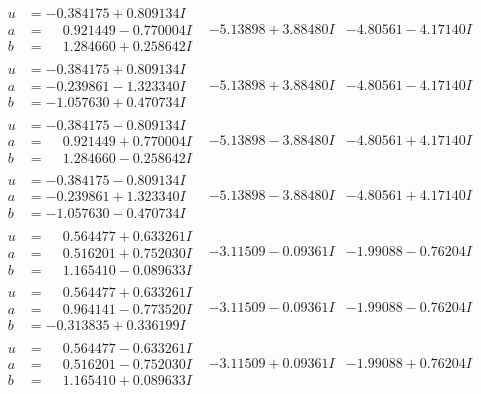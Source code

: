 \documentclass[1p]{elsarticle_modified}
\theoremstyle{definition}
\begin{document}
$$\begin{array}{c|c|c}
\begin{aligned}
u &= -0.384175 + 0.809134 I \\
a &= \phantom{-}0.921449 - 0.770004 I \\
b &= \phantom{-}1.284660 + 0.258642 I\end{aligned}
 & -5.13898 + 3.88480 I & -4.80561 - 4.17140 I \\ \hline\begin{aligned}
u &= -0.384175 + 0.809134 I \\
a &= -0.239861 - 1.323340 I \\
b &= -1.057630 + 0.470734 I\end{aligned}
 & -5.13898 + 3.88480 I & -4.80561 - 4.17140 I \\ \hline\begin{aligned}
u &= -0.384175 - 0.809134 I \\
a &= \phantom{-}0.921449 + 0.770004 I \\
b &= \phantom{-}1.284660 - 0.258642 I\end{aligned}
 & -5.13898 - 3.88480 I & -4.80561 + 4.17140 I \\ \hline\begin{aligned}
u &= -0.384175 - 0.809134 I \\
a &= -0.239861 + 1.323340 I \\
b &= -1.057630 - 0.470734 I\end{aligned}
 & -5.13898 - 3.88480 I & -4.80561 + 4.17140 I \\ \hline\begin{aligned}
u &= \phantom{-}0.564477 + 0.633261 I \\
a &= \phantom{-}0.516201 + 0.752030 I \\
b &= \phantom{-}1.165410 - 0.089633 I\end{aligned}
 & -3.11509 - 0.09361 I & -1.99088 - 0.76204 I \\ \hline\begin{aligned}
u &= \phantom{-}0.564477 + 0.633261 I \\
a &= \phantom{-}0.964141 - 0.773520 I \\
b &= -0.313835 + 0.336199 I\end{aligned}
 & -3.11509 - 0.09361 I & -1.99088 - 0.76204 I \\ \hline\begin{aligned}
u &= \phantom{-}0.564477 - 0.633261 I \\
a &= \phantom{-}0.516201 - 0.752030 I \\
b &= \phantom{-}1.165410 + 0.089633 I\end{aligned}
 & -3.11509 + 0.09361 I & -1.99088 + 0.76204 I \\ \hline\begin{aligned}

\end{aligned}
\end{array}$$
\end{document}

